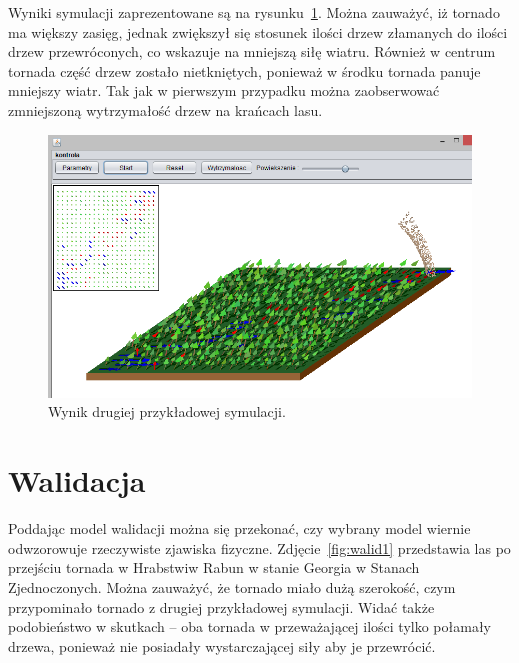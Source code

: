 Wyniki symulacji zaprezentowane są na rysunku~\ref{fig:test2}. Można zauważyć, iż tornado ma większy zasięg, jednak zwiększył się stosunek ilości drzew złamanych do ilości drzew przewróconych, co wskazuje na mniejszą siłę wiatru. Również w centrum tornada część drzew zostało nietkniętych, ponieważ w środku tornada panuje mniejszy wiatr. Tak jak w pierwszym przypadku można zaobserwować zmniejszoną wytrzymałość drzew na krańcach lasu.

\begin{figure}[!h]
	\center
	\includegraphics[scale=0.62]{test2}
	\caption{Wynik drugiej przykładowej symulacji.}
	\label{fig:test2}
\end{figure} 

\section{Walidacja}

Poddając model walidacji można się przekonać, czy wybrany model wiernie odwzorowuje rzeczywiste zjawiska fizyczne.
Zdjęcie~\ref{fig:walid1} przedstawia las po przejściu tornada w Hrabstwiw Rabun w stanie Georgia w Stanach Zjednoczonych. Można zauważyć, że tornado miało dużą szerokość, czym przypominało tornado z drugiej przykładowej symulacji. Widać także podobieństwo w skutkach -- oba tornada w przeważającej ilości tylko połamały drzewa, ponieważ nie posiadały wystarczającej siły aby je przewrócić.

